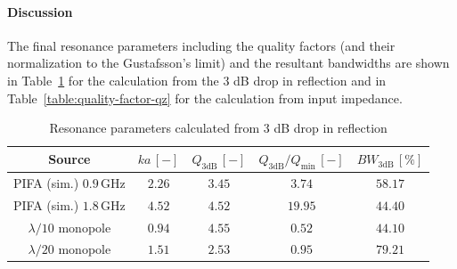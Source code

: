 \documentclass[11pt,a4paper]{article}
\begin{document}
\newpage
            \paragraph{Discussion} The final resonance parameters including the quality factors (and their normalization to the Gustafsson's limit) and the resultant bandwidths are shown in Table~\ref{table:quality-factor-q3db} for the calculation from the 3 dB drop in reflection and in Table~\ref{table:quality-factor-qz} for the calculation from input impedance.
            \begin{table}[!ht]
                \centering
                \begin{tabular}{|c||c|c|c|c|}
                    \hline
                    Source & $ka\, [-]$ & $Q_{3\mathrm{dB}}\, [-]$ & $Q_{3\mathrm{dB}}/Q_{\mathrm{min}}\, [-]$ & $\mathit{BW}_{3\mathrm{dB}}\,[\%]$\\
                    \hline\hline
                    \makecell{PIFA (sim.)\\$0.9\, \mathrm{GHz}$} & $2.26$ & $3.45$ & $3.74$ & $58.17$\\
                    \hline
                    \makecell{PIFA (sim.)\\$1.8\, \mathrm{GHz}$} & $4.52$ & $4.52$ & $19.95$ & $44.40$\\
                    \hline
                    \makecell{$\lambda/10$\\monopole} & $0.94$ & $4.55$ & $0.52$ & $44.10$\\
                    \hline
                    \makecell{$\lambda/20$\\monopole} & $1.51$ & $2.53$ & $0.95$ & $79.21$\\
                    \hline
                \end{tabular}
                \caption{\label{table:quality-factor-q3db}Resonance parameters calculated from 3 dB drop in reflection}
            \end{table}
\end{document}
